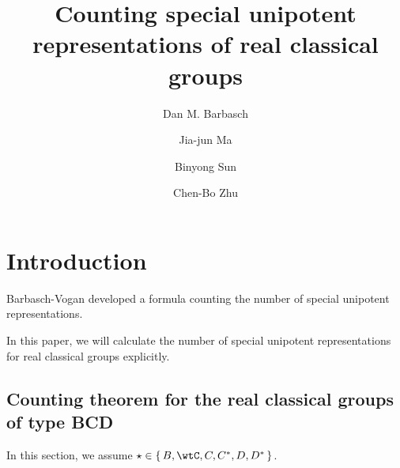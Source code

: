 \documentclass[12pt,a4paper]{amsart}
\numberwithin{equation}{section}
\theoremstyle{remark}
\begin{document}
\title[]{Counting special unipotent representations of real classical groups}

\author [D. Barbasch] {Dan M. Barbasch}
\address{the Department of Mathematics\\
  310 Malott Hall, Cornell University, Ithaca, New York 14853 }

\author [J.-J. Ma] {Jia-jun Ma}
\address{School of Mathematical Sciences\\
  Shanghai Jiao Tong University\\
  800 Dongchuan Road, Shanghai, 200240, China} 

\author [B. Sun] {Binyong Sun}
\address{Academy of Mathematics and Systems Science\\
  Chinese Academy of Sciences\\
  Beijing, 100190, China} 

\author [C.-B. Zhu] {Chen-Bo Zhu}
\address{Department of Mathematics\\
  National University of Singapore\\
  10 Lower Kent Ridge Road, Singapore 119076} 




 

\maketitle


\tableofcontents
\section{Introduction}

%

Barbasch-Vogan \cite{BVUni,BV.W} developed a formula counting the number of
special unipotent representations.

In this paper, we will calculate the number of special unipotent representations
for real classical groups explicitly.



\subsection{Counting theorem for the real classical groups of type BCD}
In this section, we assume $\star \in \set{B,\wtC,C,C^{*}, D, D^{*}}$.
\end{document}
